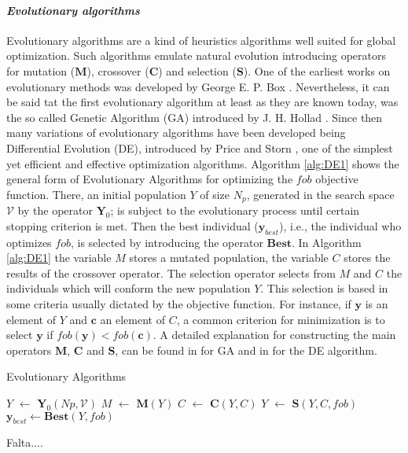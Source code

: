 \paragraph{\it Evolutionary algorithms}
Evolutionary algorithms are a kind of heuristics algorithms well 
suited for global optimization. Such algorithms emulate natural
evolution introducing operators for mutation ($\mathbf{M}$), crossover 
($\mathbf{C}$) and selection ($\mathbf{S}$). One of the earliest works
on evolutionary methods was developed by George E. P. Box \cite{Box1957}.
Nevertheless, it can be said tat the first evolutionary algorithm at
least as they are known today, was the so called Genetic Algorithm (GA) 
introduced by J. H. Hollad \cite{JHH1975}. Since then many variations of
evolutionary algorithms have been developed being Differential Evolution (DE),
introduced by Price and Storn \cite{Storn1997}, one of the simplest yet efficient and 
effective optimization algorithms. Algorithm \ref{alg:DE1} shows the 
general form of Evolutionary Algorithms for optimizing the $fob$ 
objective function. There, an initial population $Y$ of size $N_p$, 
generated in the search space $\mathcal{V}$ by the operator $\mathbf{Y}_0$;
is subject to the evolutionary process until certain stopping criterion is 
met. Then the best individual ($\mathbf{y}_{best}$), i.e., the individual who
optimizes $fob$, is selected by introducing the operator $\mathbf{Best}$. 
In Algorithm \ref{alg:DE1} the variable $M$ stores a mutated population, 
the variable $C$ stores the results of the crossover operator. The selection
operator selects from $M$ and $C$ the individuals which will conform the new
population $Y$. This selection is based in some criteria usually dictated by the
objective function. For instance, if $\mathbf{y}$ is an element of $Y$
and $\mathbf{c}$ an element of $C$, a common criterion for minimization is 
to select $\mathbf{y}$ if $fob(\mathbf{y})<fob(\mathbf{c})$.
A detailed explanation for constructing the main operators 
$\mathbf{M}$, $\mathbf{C}$ and $\mathbf{S}$, can be found in
\cite{Bagchi1999} for GA and in \cite{Price_Storn2005} for the DE
algorithm.
%
\begin{algorithm}[H]
\caption{Evolutionary Algorithms}
\label{alg:DE1}
\begin{algorithmic}
\State $Y$ $\leftarrow$ $\mathbf{Y}_0(Np,\mathcal{V})$
\State $M$ $\leftarrow$  $\mathbf{M}(Y)$
\State $C$ $\leftarrow$  $\mathbf{C}(Y,C)$
\State $Y$ $\leftarrow$  $\mathbf{S}(Y,C,fob)$ 
\EndWhile
\State $\mathbf{y}_{best} \leftarrow \mathbf{Best}(Y, fob)$
\end{algorithmic}
\end{algorithm}%


Falta....